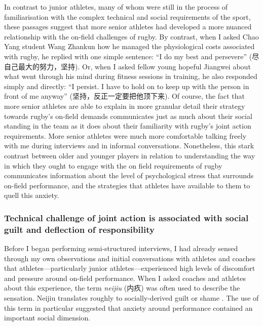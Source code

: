 \begin{CJK}{UTF8}{gbsn}
In contrast to junior athletes, many of whom were still in the process of familiarisation with the complex technical and social requirements of the sport, these passages suggest that more senior athletes had developed a more nuanced relationship with the on-field challenges of rugby.  By contrast, when I asked Chao Yang student Wang Zhankun how he managed the physiological costs associated with rugby, he replied with one simple sentence: ``I do my best and persevere'' (尽自己最大的努力，坚持).  Or, when I asked fellow young hopeful Jiangwei about what went through his mind during fitness sessions in training, he also responded simply and directly: ``I persist. I have to hold on to keep up with the person in front of me anyway'' (坚持，反正一定要把他顶下来).  Of course, the fact that more senior athletes are able to explain in more granular detail their strategy towards rugby's on-field demands communicates just as much about their social standing in the team as it does about their familiarity with rugby's joint action requirements.  More senior athletes were much more comfortable talking freely with me during interviews and in informal conversations.  Nonetheless, this stark contrast between older and younger players in relation to understanding the way in which they ought to engage with the on field requirements of rugby communicates information about the level of psychological stress that surrounds on-field performance, and the strategies that athletes have available to them to quell this anxiety.







\subsubsection{Technical challenge of joint action is associated with social guilt and deflection of responsibility}

Before I began performing semi-structured interviews, I had already sensed through my own observations and initial conversations with athletes and coaches that athletes---particularly junior athletes---experienced high levels of discomfort and pressure around on-field performance. When I asked coaches and athletes about this experience, the term \textit{neijiu} (内疚) was often used to describe the sensation.  Neijiu translates roughly to socially-derived guilt or shame \citep{Pleco2018}.  The use of this term in particular suggested that anxiety around performance contained an important social dimension.


\end{CJK}
